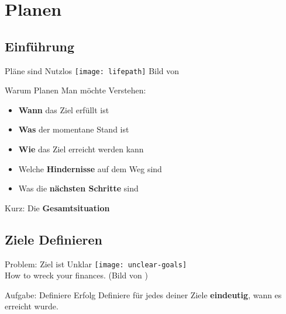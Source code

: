\section{Planen}


\subsection{Einführung}

\begin{frame}[c]{Pläne sind Nutzlos}
    \normalsize
    \texttt{[image: lifepath]}
    Bild von \cite{lifepath-pic}
\end{frame}


\begin{frame}[c]{Warum Planen}
    \large
    Man möchte Verstehen:
    \begin{itemize}[<+(1)->]
        \item \textbf{Wann} das Ziel erfüllt ist
        \item \textbf{Was} der momentane Stand ist
        \item \textbf{Wie} das Ziel erreicht werden kann
        \item Welche \textbf{Hindernisse} auf dem Weg sind
        \item Was die \textbf{nächsten Schritte} sind
    \end{itemize}
    \pause
    Kurz: Die \textbf{Gesamtsituation}
\end{frame}


\subsection{Ziele Definieren}


\begin{frame}[c]{Problem: Ziel ist Unklar}
    \normalsize
    \texttt{[image: unclear-goals]} \\
    How to wreck your finances. (Bild von \cite{unclear-goals-pic})
\end{frame}


\begin{frame}[c]%
    \begin{block}{Aufgabe: Definiere Erfolg}
        Definiere für jedes deiner Ziele \textbf{eindeutig}, wann es erreicht wurde.
    \end{block}
\end{frame}

